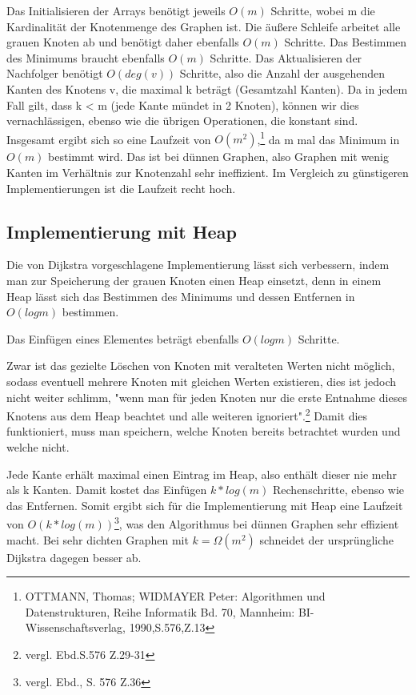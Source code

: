 Das Initialisieren der Arrays benötigt jeweils $O(m)$ Schritte, wobei m die Kardinalität der Knotenmenge des Graphen ist.
Die äußere Schleife arbeitet alle grauen Knoten ab und benötigt daher ebenfalls $O(m)$ Schritte. Das Bestimmen des Minimums braucht ebenfalls $O(m)$ Schritte.
Das Aktualisieren der Nachfolger benötigt $O(deg(v))$ Schritte, also die Anzahl der ausgehenden Kanten des Knotens v, die maximal k beträgt (Gesamtzahl Kanten). Da in jedem Fall gilt, dass k < m (jede Kante mündet in 2 Knoten), können wir dies vernachlässigen, ebenso wie die übrigen Operationen, die konstant sind.
Insgesamt ergibt sich so eine Laufzeit von $O(m^{2})$,\footnote{OTTMANN, Thomas; WIDMAYER Peter: Algorithmen und Datenstrukturen, Reihe Informatik Bd. 70, Mannheim: BI-Wissenschaftsverlag, 1990,S.576,Z.13} da m mal das Minimum in $O(m)$ bestimmt wird.
Das ist bei dünnen Graphen, also Graphen mit wenig Kanten im Verhältnis zur Knotenzahl sehr ineffizient. Im Vergleich zu günstigeren Implementierungen ist die Laufzeit recht hoch.

\subsection{Implementierung mit Heap}
Die von Dijkstra vorgeschlagene Implementierung lässt sich verbessern, indem man zur Speicherung der grauen Knoten einen Heap einsetzt, denn in einem Heap lässt sich das Bestimmen des Minimums und dessen Entfernen in $O(log m)$ bestimmen.

\parindent0pt Das Einfügen eines Elementes beträgt ebenfalls $O(log m)$ Schritte.

\parindent0pt Zwar ist das gezielte Löschen von Knoten mit veralteten Werten nicht möglich, sodass eventuell mehrere Knoten mit gleichen Werten existieren, dies ist jedoch nicht weiter schlimm, "wenn man für jeden Knoten nur die erste Entnahme dieses Knotens aus dem Heap beachtet und alle weiteren ignoriert".\footnote{vergl. Ebd.S.576 Z.29-31} Damit dies funktioniert, muss man speichern, welche Knoten bereits betrachtet wurden und welche nicht.

\parindent0pt Jede Kante erhält maximal einen Eintrag im Heap, also enthält dieser nie mehr als k Kanten. Damit kostet das Einfügen $k*log(m)$ Rechenschritte, ebenso wie das Entfernen. Somit ergibt sich für die Implementierung mit Heap eine Laufzeit von $O(k*log(m))$\footnote{vergl. Ebd., S. 576 Z.36}, was den Algorithmus bei dünnen Graphen sehr effizient macht.
Bei sehr dichten Graphen mit $k = \Omega (m^{2})$ schneidet der ursprüngliche Dijkstra dagegen besser ab.


